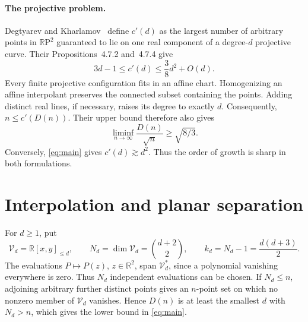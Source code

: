 \documentclass[11pt,letterpaper]{article}
\newcommand{\R}{\mathbb R}
\newcommand{\Vd}{\mathcal V_d}
\begin{document}
\paragraph{The projective problem.}
Degtyarev and Kharlamov~\cite[\S\S4.6--4.7]{dk1} define $c'(d)$ as the largest number of arbitrary points in $\R\mathrm P^2$ guaranteed to lie on one real component of a degree-$d$ projective curve. Their Propositions~4.7.2 and~4.7.4 give
\[
3d-1\leq c'(d)\leq\frac38d^2+O(d).
\]
Every finite projective configuration fits in an affine chart. Homogenizing an affine interpolant preserves the connected subset containing the points. Adding distinct real lines, if necessary, raises its degree to exactly $d$. Consequently, $n\leq c'(D(n))$. Their upper bound therefore also gives
\[
\liminf_{n\to\infty}\frac{D(n)}{\sqrt n}\geq\sqrt{8/3}.
\]
Conversely, \eqref{eq:main} gives $c'(d)\gtrsim d^2$. Thus the order of growth is sharp in both formulations.

\section{Interpolation and planar separation}
For $d\geq1$, put
\begin{equation}\label{eq:dimension}
\Vd=\R[x,y]_{\leq d},\qquad
N_d=\dim\Vd=\binom{d+2}{2},\qquad
k_d=N_d-1=\frac{d(d+3)}2.
\end{equation}
The evaluations $P\mapsto P(z)$, $z\in\R^2$, span $\Vd^*$, since a polynomial vanishing everywhere is zero. Thus $N_d$ independent evaluations can be chosen. If $N_d\leq n$, adjoining arbitrary further distinct points gives an $n$-point set on which no nonzero member of $\Vd$ vanishes. Hence $D(n)$ is at least the smallest $d$ with $N_d>n$, which gives the lower bound in \eqref{eq:main}.
\end{document}
